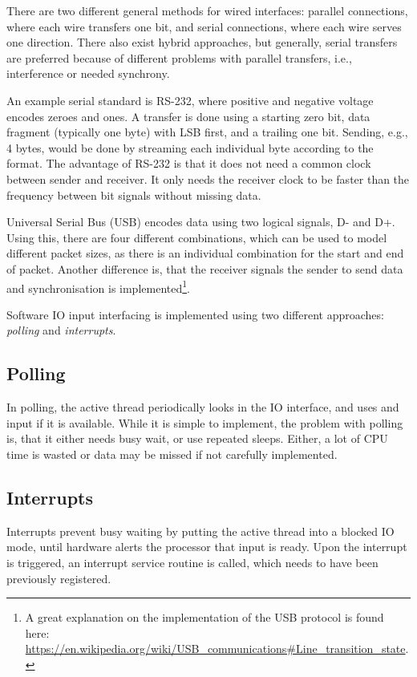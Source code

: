 There are two different general methods for wired interfaces: parallel connections, where each wire transfers one bit, and serial connections, where each wire serves one direction.
There also exist hybrid approaches, but generally, serial transfers are preferred because of different problems with parallel transfers, i.e., interference or needed synchrony.

An example serial standard is RS-232, where positive and negative voltage encodes zeroes and ones.
A transfer is done using a starting zero bit, data fragment (typically one byte) with LSB first, and a trailing one bit.
Sending, e.g., 4 bytes, would be done by streaming each individual byte according to the format.
The advantage of RS-232 is that it does not need a common clock between sender and receiver.
It only needs the receiver clock to be faster than the frequency between bit signals without missing data.

Universal Serial Bus (USB) encodes data using two logical signals, D- and D+.
Using this, there are four different combinations, which can be used to model different packet sizes, as there is an individual combination for the start and end of packet.
Another difference is, that the receiver signals the sender to send data and synchronisation is implemented\footnote{A great explanation on the implementation of the USB protocol is found here: \url{https://en.wikipedia.org/wiki/USB_communications\#Line_transition_state}.}.

Software IO input interfacing is implemented using two different approaches: \emph{polling} and \emph{interrupts}.

\subsection{Polling}
In polling, the active thread periodically looks in the IO interface, and uses and input if it is available.
While it is simple to implement, the problem with polling is, that it either needs busy wait, or use repeated sleeps.
Either, a lot of CPU time is wasted or data may be missed if not carefully implemented.

\subsection{Interrupts}
Interrupts prevent busy waiting by putting the active thread into a blocked IO mode, until hardware alerts the processor that input is ready.
Upon the interrupt is triggered, an interrupt service routine is called, which needs to have been previously registered.

